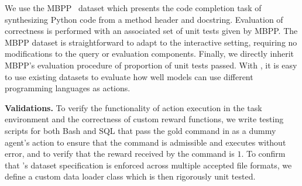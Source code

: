 We use the MBPP~\cite{austin2021program} dataset which presents the code completion task of synthesizing Python code from a method header and docstring.
Evaluation of correctness is performed with an associated set of unit tests given by MBPP.
The MBPP dataset is straightforward to adapt to the interactive setting, requiring no modifications to the query or evaluation components.
Finally, we directly inherit MBPP's evaluation procedure of proportion of unit tests passed.
With \benchmark{}, it is easy to use existing datasets to evaluate how well models can use different programming languages as actions.

\textbf{Validations.}
To verify the functionality of action execution in the task environment and the correctness of custom reward functions, we write testing scripts for both Bash and SQL that pass the gold command in as a dummy agent's action to ensure that the command is admissible and executes without error, and to verify that the reward received by the command is $1$.
To confirm that \benchmark{}'s dataset specification is enforced across multiple accepted file formats, we define a custom \benchmark{} data loader class which is then rigorously unit tested.

